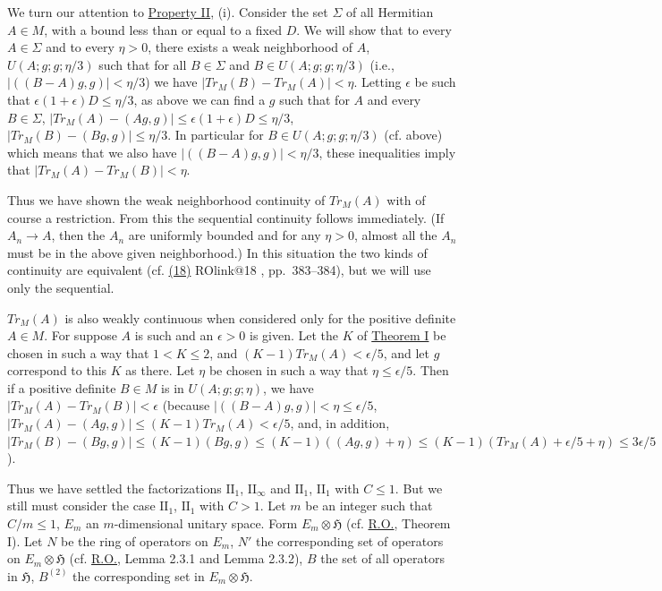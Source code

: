 \documentclass[twoside,leqno]{article}
\makeatletter
\newcommand{\TrM}{Tr_M}
\newcommand{\cH}{\mathfrak{H}}
\newcommand{\RO}{\href{https://doi.org/10.2307/1968693}{R.O.}}
\newcommand{\ROcite}[1]{%
  \@ifundefined{ROlink@#1}
    {\href{https://doi.org/10.2307/1968693}{(#1)}}
    {\csname ROlink@#1\endcsname{(#1)}}%
}
\newcommand{\StatementRef}[2]{\hyperlink{stmt:#1}{#2}}
\makeatother
\begin{document}
We turn our attention to \StatementRef{property:II}{Property II}, (i). Consider the set $\Sigma$ of all
Hermitian $A\in M$, with a bound less than or equal to a fixed $D$. We will
show that to every $A\in\Sigma$ and to every $\eta>0$, there exists a weak neighborhood
of $A$, $U(A;g;g;\eta/3)$ such that for all $B\in\Sigma$ and
$B\in U(A;g;g;\eta/3)$ (i.e., $\lvert((B-A)g,g)\rvert<\eta/3$) we have
$\lvert\TrM(B)-\TrM(A)\rvert<\eta$. Letting $\epsilon$ be such that
$\epsilon(1+\epsilon)D\leq\eta/3$, as above we can find a $g$ such that for $A$ and every $B\in\Sigma$,
$\lvert\TrM(A)-(Ag,g)\rvert\leq\epsilon(1+\epsilon)D\leq\eta/3$,
$\lvert\TrM(B)-(Bg,g)\rvert\leq\eta/3$.
In particular for $B\in U(A;g;g;\eta/3)$ (cf. above) which means that we also have
$\lvert((B-A)g,g)\rvert<\eta/3$, these inequalities imply that
$\lvert\TrM(A)-\TrM(B)\rvert<\eta$.

Thus we have shown the weak neighborhood continuity of $\TrM(A)$ with
of course a restriction. From this the sequential continuity follows immediately.
(If $A_n\to A$, then the $A_n$ are uniformly bounded and for any $\eta>0$,
almost all the $A_n$ must be in the above given neighborhood.) In this situation
the two kinds of continuity are equivalent (cf. \ROcite{18}, pp.~383--384), but we
will use only the sequential.

$\TrM(A)$ is also weakly continuous when considered only for the positive
definite $A\in M$. For suppose $A$ is such and an $\epsilon>0$ is given. Let the $K$ of
\StatementRef{theorem:I}{Theorem I} be chosen in such a way that $1<K\leq2$, and
$(K-1)\TrM(A)<\epsilon/5$, and let $g$ correspond to this $K$ as there. Let $\eta$ be chosen in such a way
that $\eta\leq\epsilon/5$. Then if a positive definite $B\in M$ is in $U(A;g;g;\eta)$, we have
$\lvert\TrM(A)-\TrM(B)\rvert<\epsilon$ (because
$\lvert((B-A)g,g)\rvert<\eta\leq\epsilon/5$,
$\lvert\TrM(A)-(Ag,g)\rvert\leq(K-1)\TrM(A)<\epsilon/5$, and, in addition,
$\lvert\TrM(B)-(Bg,g)\rvert\leq(K-1)(Bg,g)
\leq(K-1)((Ag,g)+\eta)
\leq(K-1)(\TrM(A)+\epsilon/5+\eta)\leq3\epsilon/5$).

Thus we have settled the factorizations $\mathrm{II}_1$, $\mathrm{II}_{\infty}$ and
$\mathrm{II}_1$, $\mathrm{II}_1$ with $C\leq1$. But we still must consider the case $\mathrm{II}_1$, $\mathrm{II}_1$ with $C>1$.
Let $m$ be an integer such that $C/m\leq1$, $E_m$ an $m$-dimensional unitary space.
Form $E_m\otimes\cH$ (cf. \RO{}, Theorem I). Let $N$ be the ring of operators on $E_m$,
$N'$ the corresponding set of operators on $E_m\otimes\cH$ (cf. \RO{}, Lemma 2.3.1 and
Lemma 2.3.2), $B$ the set of all operators in $\cH$, $B^{(2)}$ the corresponding set in
$E_m\otimes\cH$.
\end{document}
